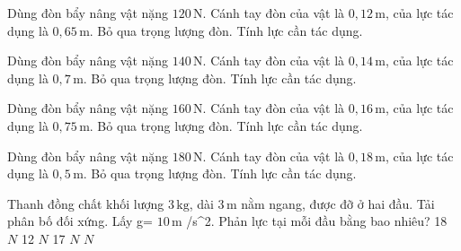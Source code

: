 \begin{bt}
Dùng đòn bẩy nâng vật nặng $120\,\text{N}$. Cánh tay đòn của vật là $0,12\,\text{m}$, của lực tác dụng là $0,65\,\text{m}$. Bỏ qua trọng lượng đòn. Tính lực cần tác dụng.
\end{bt}

\begin{bt}
Dùng đòn bẩy nâng vật nặng $140\,\text{N}$. Cánh tay đòn của vật là $0,14\,\text{m}$, của lực tác dụng là $0,7\,\text{m}$. Bỏ qua trọng lượng đòn. Tính lực cần tác dụng.
\end{bt}

\begin{bt}
Dùng đòn bẩy nâng vật nặng $160\,\text{N}$. Cánh tay đòn của vật là $0,16\,\text{m}$, của lực tác dụng là $0,75\,\text{m}$. Bỏ qua trọng lượng đòn. Tính lực cần tác dụng.
\end{bt}

\begin{bt}
Dùng đòn bẩy nâng vật nặng $180\,\text{N}$. Cánh tay đòn của vật là $0,18\,\text{m}$, của lực tác dụng là $0,5\,\text{m}$. Bỏ qua trọng lượng đòn. Tính lực cần tác dụng.
\end{bt}

\begin{ex}
Thanh đồng chất khối lượng $3\,\text{kg}$, dài $3\,\text{m}$ nằm ngang, được đỡ ở hai đầu. Tải phân bố đối xứng. Lấy g= $10\,\text{m}$ /s^2. Phản lực tại mỗi đầu bằng bao nhiêu?
\choice
{18 $N$}
{12 $N$}
{17 $N$}
{ $N$}
\end{ex}

